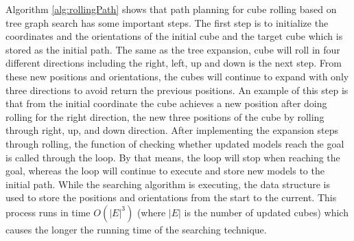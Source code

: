 \noindent Algorithm \ref{alg:rollingPath} shows that path planning for cube rolling based on tree graph search has some important steps. 
The first step is to initialize the coordinates and the orientations of the initial cube and the target cube which is stored as the initial path. 
The same as the tree expansion, cube will roll in four different directions including the right, left, up and down is the next step. 
From these new positions and orientations, the cubes will continue to expand with only three directions to avoid return the previous positions. 
An example of this step is that from the initial coordinate the cube achieves a new position after doing rolling for the right direction, the new three positions of the cube by rolling through right, up, and down direction. 
After implementing the expansion steps through rolling, the function of checking whether updated models reach the goal is called through the loop. 
By that means, the loop will stop when reaching the goal, whereas the loop will continue to execute and store new models to the initial path.
While the searching algorithm is executing, the data structure is used to store the positions and orientations from the start to the current. This process runs in time $O(|E|^3)$ (where $|E|$ is the number of updated cubes) which causes the longer the running time of the searching technique. \\

